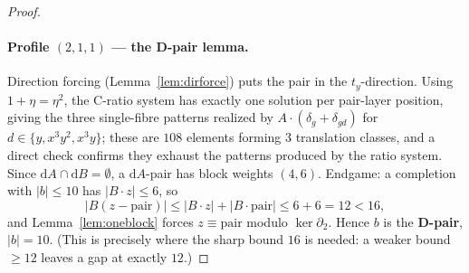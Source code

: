 \documentclass[11pt]{article}
\newcommand{\wt}[1]{\lvert #1\rvert}
\newcommand{\ty}{t_y}
\theoremstyle{plain}
\theoremstyle{definition}
\theoremstyle{remark}
\begin{document}
\begin{proof}
\paragraph{Profile $(2,1,1)$ --- the D-pair lemma.} Direction forcing
(Lemma~\ref{lem:dirforce}) puts the pair in the $\ty$-direction. Using $1+\eta=\eta^2$, the
C-ratio system has exactly one solution per pair-layer position, giving the three
single-fibre patterns realized by $A\cdot(\delta_g+\delta_{gd})$ for $d\in\{y,x^3y^2,x^3y\}$;
these are $108$ elements forming $3$ translation classes, and a direct check confirms they
exhaust the patterns produced by the ratio system. Since $\mathrm dA\cap\mathrm dB=\emptyset$,
a $\mathrm dA$-pair has block weights $(4,6)$. Endgame: a completion with $\wt b\le 10$ has
$\wt{B\cdot z}\le 6$, so
\[
  \wt{B(z-\text{pair})}\le\wt{B\cdot z}+\wt{B\cdot\text{pair}}\le 6+6=12<16,
\]
and Lemma~\ref{lem:oneblock} forces $z\equiv\text{pair}$ modulo $\ker\partial_2$. Hence
$b$ is the \textbf{D-pair}, $\wt b=10$. (This is precisely where the sharp bound $16$ is
needed: a weaker bound $\ge 12$ leaves a gap at exactly $12$.)


\end{proof}
\end{document}
